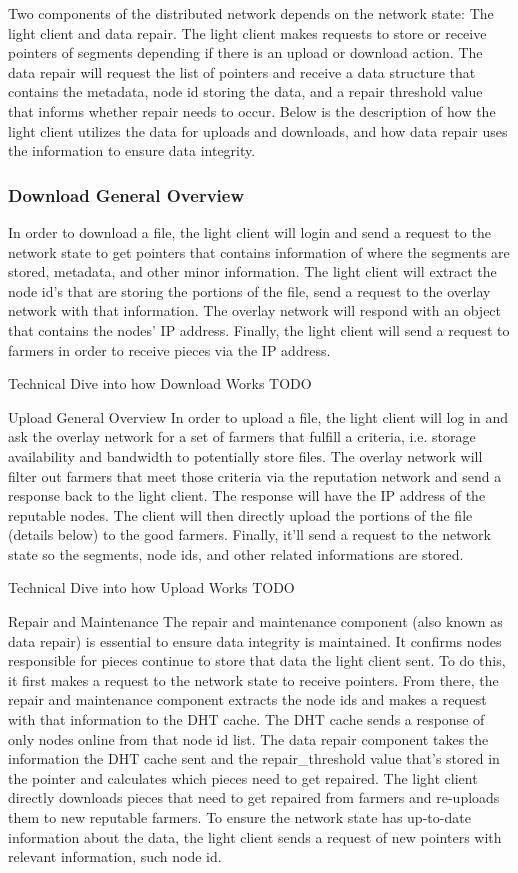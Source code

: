 \documentclass[a4paper,10pt]{article}
\newcommand{\todo}[1]{{\color{red} TODO #1}}
\begin{document}
Two components of the distributed network depends on the network state: The light client and data repair.  The light client makes requests to store or receive pointers of segments depending if there is an upload or download action.  The data repair will request the list of pointers and receive a data structure that contains the metadata, node id storing the data, and a repair threshold value that informs whether repair needs to occur. Below is the description of how the light client utilizes the data for uploads and downloads, and how data repair uses the information to ensure data integrity. 

\subsubsection{Download General Overview}
In order to download a file, the light client will login and send a request to the network state to get pointers that contains information of where the segments are stored, metadata, and other minor information.  The light client will extract the node id’s that are storing the portions of the file, send a request to the overlay network with that information. The overlay network will respond with an object that contains the nodes’ IP address.  Finally, the light client will send a request to farmers in order to receive pieces via the IP address.


Technical Dive into how Download Works
\todo{}

Upload General Overview
In order to upload a file, the light client will log in and ask the overlay network for a set of farmers that fulfill a criteria, i.e. storage availability and bandwidth to potentially store files. The overlay network will filter out farmers that meet those criteria via the reputation network and send a response back to the light client. The response will have the IP address of the reputable nodes.  The client will then directly upload the portions of the file (details below) to the good farmers. Finally, it’ll send a request to the network state so the segments, node ids, and other related informations are stored. 

Technical Dive into how Upload Works
\todo{}

Repair and Maintenance
The repair and maintenance component (also known as data repair) is essential to ensure data integrity is maintained.  It confirms nodes responsible for pieces continue to store that data the light client sent. To do this, it first makes a request to the network state to receive pointers. From there, the repair and maintenance component extracts the node ids and makes a request with that information to the DHT cache. The DHT cache sends a response of only nodes online from that node id list. The data repair component takes the information the DHT cache sent and the repair_threshold value that's stored in the pointer and calculates which pieces need to get repaired. The light client directly downloads pieces that need to get repaired from farmers and re-uploads them to new reputable farmers. To ensure the network state has up-to-date information about the data, the light client sends a request of new pointers with relevant information, such node id.
\end{document}
